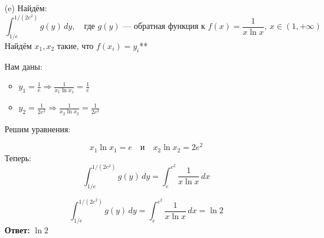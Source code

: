 \documentclass[a4paper]{article}
\begin{document}
\begin{enumerate}
\begin{enumerate}
        \item[(e)]Найдём:
        \[
        \int_{1/e}^{1/(2e^2)} g(y) \, dy,\quad \text{где } g(y) \text{ — обратная функция к } f(x) = \frac{1}{x \ln x},\ x \in (1, +\infty)
        \]
        Найдём \( x_1, x_2 \) такие, что \( f(x_i) = y_i \)**

        Нам даны:
        \begin{itemize}
            \item \( y_1 = \frac{1}{e} \Rightarrow \frac{1}{x_1 \ln x_1} = \frac{1}{e} \)
            \item \( y_2 = \frac{1}{2e^2} \Rightarrow \frac{1}{x_2 \ln x_2} = \frac{1}{2e^2} \)
        \end{itemize}
        Решим уравнения:
        
        $$ x_1 \ln x_1 = e \quad \text{и} \quad x_2 \ln x_2 = 2e^2 $$
        Теперь:
        \[
        \int_{1/e}^{1/(2e^2)} g(y) \, dy = \int_{e}^{e^2} \frac{1}{x \ln x} \, dx
        \]
        
        \[
        \int_{1/e}^{1/(2e^2)} g(y) \, dy = \int_{e}^{e^2} \frac{1}{x \ln x} \, dx = \ln 2
        \]
        \textbf{Ответ: } $\ln 2$

    \end{enumerate}

\end{enumerate}
\end{document}
